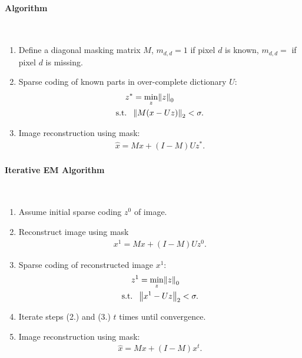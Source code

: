 \paragraph{Algorithm} $\ $
\begin{enumerate}
    \item Define a diagonal masking matrix $M$, $m_{d,d} = 1$ if pixel $d$ is known, $m_{d,d} = $ if pixel $d$ is missing.
    \item Sparse coding of known parts in over-complete dictionary $U$:
    \begin{align*}
        z^* &= \min_z \norm{z}_0\\
        \text{s.t. }\ &\norm{M(x-Uz)}_2 < \sigma.
    \end{align*}
    \item Image reconstruction using mask:
    \begin{align*}
        \hat x = Mx + (I-M)Uz^*.
    \end{align*}
\end{enumerate}
\paragraph{Iterative EM Algorithm} $\ $
\begin{enumerate}
\item Assume initial sparse coding $z^0$ of image.
\item Reconstruct image using mask
\begin{align*}
    x^1 = Mx + (I-M)Uz^0.
\end{align*}
\item Sparse coding of reconstructed image $x^1$:
    \begin{align*}
        z^1 &= \min_z \norm{z}_0\\
        \text{s.t. }\ &\norm{x^1-Uz}_2 <\sigma.
    \end{align*}
\item Iterate steps (2.) and (3.) $t$ times until convergence.
\item Image reconstruction using mask:
    \begin{align*}
        \hat x = Mx + (I-M)x^t.
    \end{align*}
\end{enumerate}








































